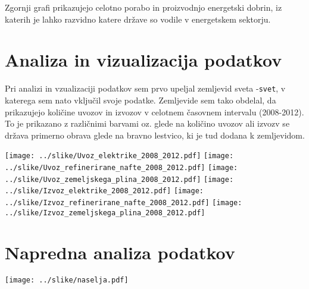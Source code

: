\documentclass[11pt,a4paper]{article}
\begin{document}
Zgornji grafi prikazujejo celotno porabo in proizvodnjo energetski dobrin, iz katerih je lahko razvidno katere države so vodile v energetskem sektorju.

\pagebreak

\section{Analiza in vizualizacija podatkov}

Pri analizi in vzualizaciji podatkov sem prvo upeljal zemljevid sveta -\verb|svet|, v katerega sem nato vključil svoje podatke. Zemljevide sem tako obdelal, da prikazujejo količine uvozov in izvozov v celotnem časovnem intervalu (2008-2012). To je prikazano z različnimi barvami oz. glede na količino uvozov ali izvozv se država primerno obrava glede na bravno lestvico, ki je tud dodana k zemljevidom.

\texttt{[image: ../slike/Uvoz\_elektrike\_2008\_2012.pdf]}
\texttt{[image: ../slike/Uvoz\_refinerirane\_nafte\_2008\_2012.pdf]}
\texttt{[image: ../slike/Uvoz\_zemeljskega\_plina\_2008\_2012.pdf]}
\texttt{[image: ../slike/Izvoz\_elektrike\_2008\_2012.pdf]}
\texttt{[image: ../slike/Izvoz\_refinerirane\_nafte\_2008\_2012.pdf]}
\texttt{[image: ../slike/Izvoz\_zemeljskega\_plina\_2008\_2012.pdf]}

\section{Napredna analiza podatkov}

\texttt{[image: ../slike/naselja.pdf]}
\end{document}
